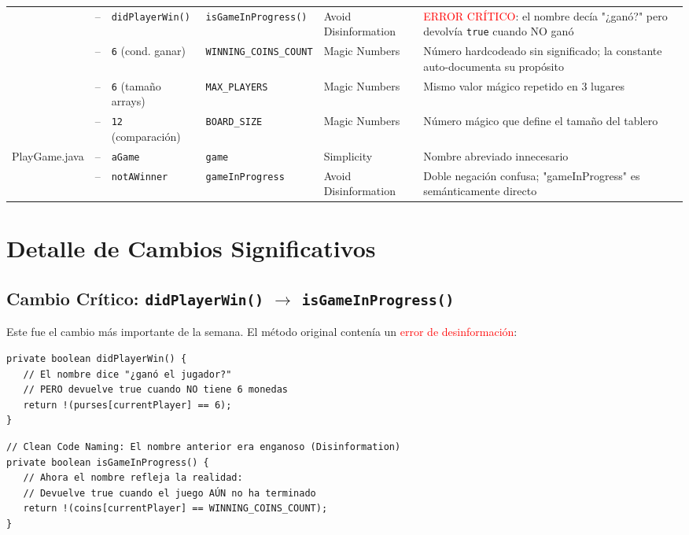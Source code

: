 \begin{table}[h]
\begin{tabular}{|p{2.5cm}|c|p{2.8cm}|p{3cm}|p{2.5cm}|p{4cm}|}
  & -- & \texttt{didPlayerWin()} & \texttt{isGameInProgress()} & Avoid Disinformation & \textcolor{red}{ERROR CRÍTICO}: el nombre decía "¿ganó?" pero devolvía \texttt{true} cuando NO ganó \\ \cline{2-6}
  & -- & \texttt{6} (cond. ganar) & \texttt{WINNING\_COINS\_COUNT} & Magic Numbers & Número hardcodeado sin significado; la constante auto-documenta su propósito \\ \cline{2-6}
  & -- & \texttt{6} (tamaño arrays) & \texttt{MAX\_PLAYERS} & Magic Numbers & Mismo valor mágico repetido en 3 lugares \\ \cline{2-6}
  & -- & \texttt{12} (comparación) & \texttt{BOARD\_SIZE} & Magic Numbers & Número mágico que define el tamaño del tablero \\
\hline
\multirow{2}{*}{PlayGame.java}
  & -- & \texttt{aGame} & \texttt{game} & Simplicity & Nombre abreviado innecesario \\ \cline{2-6}
  & -- & \texttt{notAWinner} & \texttt{gameInProgress} & Avoid Disinformation & Doble negación confusa; "gameInProgress" es semánticamente directo \\
\hline
\end{tabular}
\end{table}

\section{Detalle de Cambios Significativos}

\subsection{Cambio Crítico: \texttt{didPlayerWin()} $\rightarrow$ \texttt{isGameInProgress()}}

Este fue el cambio más importante de la semana. El método original contenía un \textcolor{red}{error de desinformación}:

\begin{lstlisting}[caption={BEFORE: Nombre engañoso con lógica invertida}, label=lst:critico_antes]
private boolean didPlayerWin() {
   // El nombre dice "¿ganó el jugador?"
   // PERO devuelve true cuando NO tiene 6 monedas
   return !(purses[currentPlayer] == 6);
}
\end{lstlisting}

\begin{lstlisting}[caption={AFTER: Nombre que coincide con el comportamiento}, label=lst:critico_despues]
// Clean Code Naming: El nombre anterior era enganoso (Disinformation)
private boolean isGameInProgress() {
   // Ahora el nombre refleja la realidad:
   // Devuelve true cuando el juego AÚN no ha terminado
   return !(coins[currentPlayer] == WINNING_COINS_COUNT);
}
\end{lstlisting}

